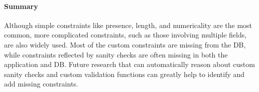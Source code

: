 \paragraph{\bf Summary} Although simple constraints like presence, length,
and numericality are the most common, more complicated constraints, such as those
involving multiple fields, are also widely used. Most of the
custom constraints are missing from the DB, while constraints reflected by sanity checks are often missing in both the application and DB. 
Future research that can automatically
reason about custom sanity checks and custom validation 
functions
can greatly help to identify and add missing constraints.